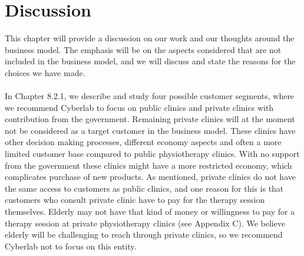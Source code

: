 \chapter{Discussion}
This chapter will provide a discussion on our work and our thoughts around the business model. The emphasis will be on the aspects considered that are not included in the business model, and we will discuss and state the reasons for the choices we have made.  \\ \\
In Chapter 8.2.1, we describe and study four possible customer segments, where we recommend Cyberlab to focus on public clinics and private clinics with contribution from the government. Remaining private clinics will at the moment not be considered as a target customer in the business model. These clinics have other decision making processes, different economy aspects and often a more limited customer base compared to public physiotherapy clinics. With no support from the government these clinics might have a more restricted economy, which complicates purchase of new products. As mentioned, private clinics do not have the same access to customers as public clinics, and one reason for this is that customers who consult private clinic have to pay for the therapy session themselves. Elderly may not have that kind of money or willingness to pay for a therapy session at private physiotherapy clinics (see Appendix C). We believe elderly will be challenging to reach through private clinics, so we recommend Cyberlab not to focus on this entity. \\ \\

